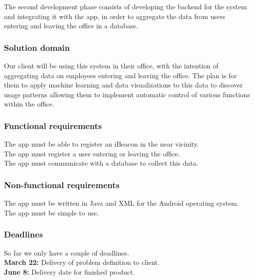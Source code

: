 \documentclass[12pt]{article}
\begin{document}
The second development phase consists of developing the backend for the system and integrating it with the app, in order to aggregate the data from users entering and leaving the office in a database.\\



\subsubsection{Solution domain}
Our client will be using this system in their office, with the intention of aggregating data on employees entering and leaving the office. The plan is for them to apply machine learning and data visualizations to this data to discover usage patterns allowing them to implement automatic control of various functions within the office.



\subsubsection{Functional requirements}
The app must be able to register an iBeacon in the near vicinity.\\
The app must register a user entering or leaving the office.\\
The app must communicate with a database to collect this data.\\



\subsubsection{Non-functional requirements}
The app must be written in Java and XML for the Android operating system.\\
The app must be simple to use.\\



\subsubsection{Deadlines}
So far we only have a couple of deadlines.\\
\textbf{March 22:} Delivery of problem definition to client.\\
\textbf{June 8:} Delivery date for finished product.\\
\end{document}
